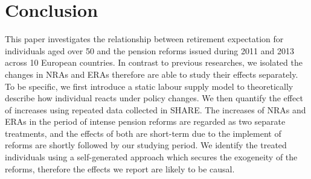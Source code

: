 \documentclass[a4paper]{article}
\begin{document}

\section{Conclusion}

This paper investigates the relationship between retirement expectation for individuals aged over 50 and the pension reforms issued during 2011 and 2013 across 10 European countries. In contrast to previous researches, we isolated the changes in NRAs and ERAs therefore are able to study their effects separately. To be specific, we first introduce a static labour supply model to theoretically describe how individual reacts under policy changes. We then quantify the effect of increases using repeated data collected in SHARE. The increases of NRAs and ERAs in the period of intense pension reforms are regarded as two separate treatments, and the effects of both are short-term due to the implement of reforms are shortly followed by our studying period. We identify the treated individuals using a self-generated approach which secures the exogeneity of the reforms, therefore the effects we report are likely to be causal.
\end{document}
